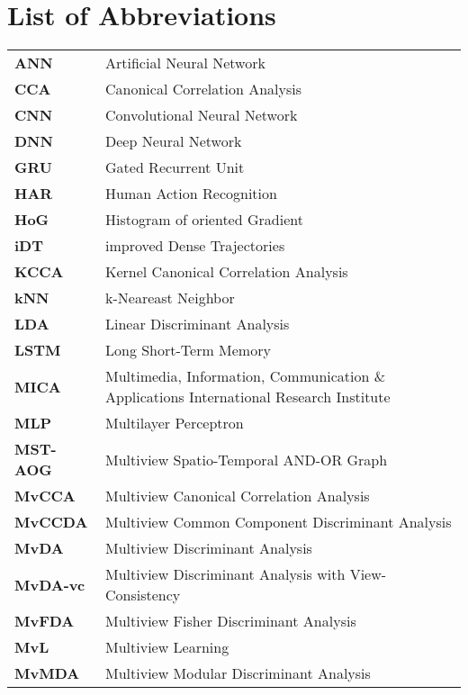
\cleardoublepage
{}
\chapter*{List of Abbreviations}

\begin{longtable}{p{} p{}}
    \textbf{ANN} & Artificial Neural Network\\
    \textbf{CCA} & Canonical Correlation Analysis\\
    \textbf{CNN} & Convolutional Neural Network\\
    \textbf{DNN} & Deep Neural Network\\
    \textbf{GRU} & Gated Recurrent Unit\\
    \textbf{HAR} & Human Action Recognition\\
    \textbf{HoG} & Histogram of oriented Gradient\\
    \textbf{iDT} & improved Dense Trajectories\\
    \textbf{KCCA} & Kernel Canonical Correlation Analysis\\
    \textbf{kNN} & k-Neareast Neighbor\\
    \textbf{LDA} & Linear Discriminant Analysis\\
    \textbf{LSTM} & Long Short-Term Memory\\
    \textbf{MICA} & Multimedia, Information, Communication \& Applications International Research Institute\\
    \textbf{MLP} & Multilayer Perceptron\\
    \textbf{MST-AOG} & Multiview Spatio-Temporal AND-OR Graph\\
    \textbf{MvCCA} & Multiview Canonical Correlation Analysis\\
    \textbf{MvCCDA} & Multiview Common Component Discriminant Analysis\\
    \textbf{MvDA} & Multiview Discriminant Analysis\\
    \textbf{MvDA-vc} & Multiview Discriminant Analysis with View-Consistency\\
    \textbf{MvFDA} & Multiview Fisher Discriminant Analysis\\
    \textbf{MvL} & Multiview Learning\\
    \textbf{MvMDA} & Multiview Modular Discriminant Analysis\\

\end{longtable}
